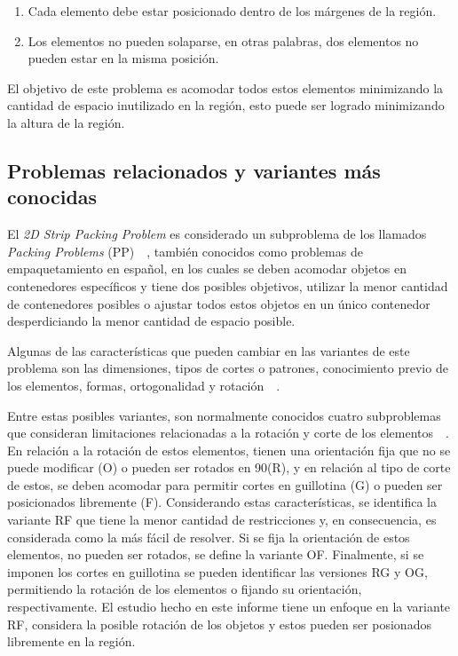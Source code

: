 \documentclass[letter, 10pt]{article}
\begin{document}
\begin{enumerate}
    \item Cada elemento debe estar posicionado dentro de los m\'argenes de la regi\'on.
    \item Los elementos no pueden solaparse, en otras palabras, dos elementos no pueden estar en la misma posici\'on.
\end{enumerate}

El objetivo de este problema es acomodar todos estos elementos minimizando la cantidad de espacio inutilizado en la regi\'on, esto puede ser logrado minimizando la altura de la regi\'on.

\subsection{Problemas relacionados y variantes m\'as conocidas}

El \emph{2D Strip Packing Problem} es considerado un subproblema de los llamados \emph{Packing Problems} (PP)~\cite{babaouglu2017solving}~\cite{lodi2002two}, tambi\'en conocidos como problemas de empaquetamiento en espa\~nol, en los cuales se deben acomodar objetos en contenedores espec\'ificos y tiene dos posibles objetivos, utilizar la menor cantidad de contenedores posibles o ajustar todos estos objetos en un \'unico contenedor desperdiciando la menor cantidad de espacio posible.

Algunas de las caracter\'isticas que pueden cambiar en las variantes de este problema son las dimensiones, tipos de cortes o patrones, conocimiento previo de los elementos, formas, ortogonalidad y rotaci\'on~\cite{junior2022rectangular}~\cite{oliveira2016survey}.

Entre estas posibles variantes, son normalmente conocidos cuatro subproblemas que consideran limitaciones relacionadas a la rotaci\'on y corte de los elementos~\cite{junior2022rectangular}~\cite{lodi2002two}. En relaci\'on a la rotaci\'on de estos elementos, tienen una orientaci\'on fija que no se puede modificar (O) o pueden ser rotados en 90\textdegree (R), y en relaci\'on al tipo de corte de estos, se deben acomodar para permitir cortes en guillotina (G) o pueden ser posicionados libremente (F). Considerando estas caracter\'isticas, se identifica la variante RF que tiene la menor cantidad de restricciones y, en consecuencia, es considerada como la m\'as f\'acil de resolver. Si se fija la orientaci\'on de estos elementos, no pueden ser rotados, se define la variante OF. Finalmente, si se imponen los cortes en guillotina se pueden identificar las versiones RG y OG, permitiendo la rotaci\'on de los elementos o fijando su orientaci\'on, respectivamente. El estudio hecho en este informe tiene un enfoque en la variante RF, considera la posible rotaci\'on de los objetos y estos pueden ser posionados libremente en la regi\'on.
\end{document}
